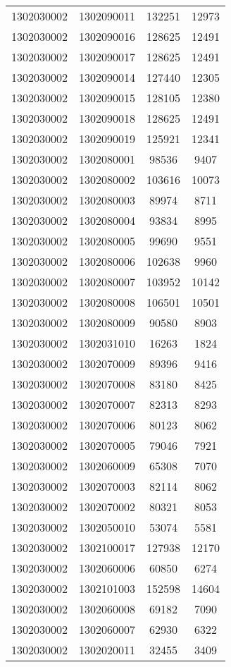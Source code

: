 \begin{longtable}{llcc}
1302030002 & 1302090011 & 132251 & 12973\\
1302030002 & 1302090016 & 128625 & 12491\\
1302030002 & 1302090017 & 128625 & 12491\\
1302030002 & 1302090014 & 127440 & 12305\\
1302030002 & 1302090015 & 128105 & 12380\\
1302030002 & 1302090018 & 128625 & 12491\\
1302030002 & 1302090019 & 125921 & 12341\\
1302030002 & 1302080001 & 98536 & 9407\\
1302030002 & 1302080002 & 103616 & 10073\\
1302030002 & 1302080003 & 89974 & 8711\\
1302030002 & 1302080004 & 93834 & 8995\\
1302030002 & 1302080005 & 99690 & 9551\\
1302030002 & 1302080006 & 102638 & 9960\\
1302030002 & 1302080007 & 103952 & 10142\\
1302030002 & 1302080008 & 106501 & 10501\\
1302030002 & 1302080009 & 90580 & 8903\\
1302030002 & 1302031010 & 16263 & 1824\\
1302030002 & 1302070009 & 89396 & 9416\\
1302030002 & 1302070008 & 83180 & 8425\\
1302030002 & 1302070007 & 82313 & 8293\\
1302030002 & 1302070006 & 80123 & 8062\\
1302030002 & 1302070005 & 79046 & 7921\\
1302030002 & 1302060009 & 65308 & 7070\\
1302030002 & 1302070003 & 82114 & 8062\\
1302030002 & 1302070002 & 80321 & 8053\\
1302030002 & 1302050010 & 53074 & 5581\\
1302030002 & 1302100017 & 127938 & 12170\\
1302030002 & 1302060006 & 60850 & 6274\\
1302030002 & 1302101003 & 152598 & 14604\\
1302030002 & 1302060008 & 69182 & 7090\\
1302030002 & 1302060007 & 62930 & 6322\\
1302030002 & 1302020011 & 32455 & 3409\\

\end{longtable}
